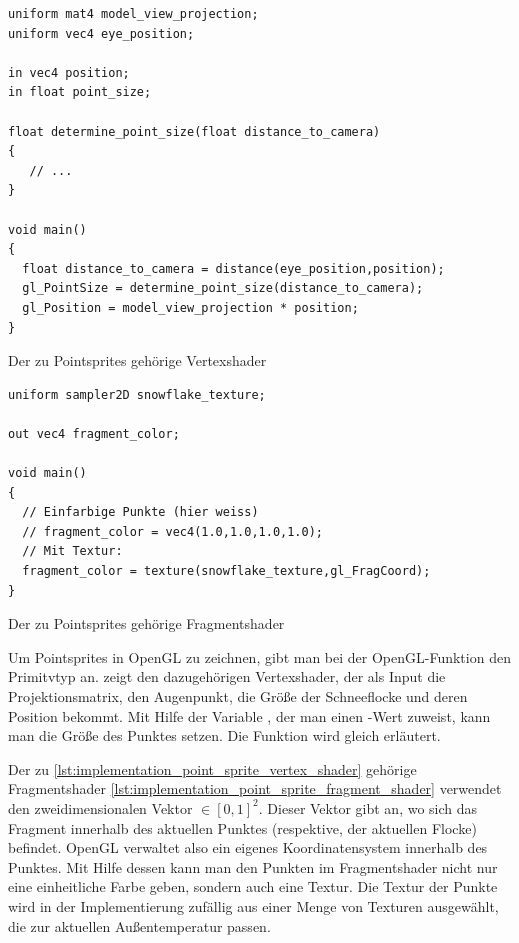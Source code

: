 \begin{listing}
\begin{verbatim}
uniform mat4 model_view_projection;
uniform vec4 eye_position;

in vec4 position;
in float point_size;

float determine_point_size(float distance_to_camera)
{
   // ...
}

void main()
{
  float distance_to_camera = distance(eye_position,position);
  gl_PointSize = determine_point_size(distance_to_camera);
  gl_Position = model_view_projection * position;
}
\end{verbatim}
\caption{Der zu Pointsprites gehörige Vertexshader}
\label{lst:implementation_point_sprite_vertex_shader}
\end{listing}

\begin{listing}
\begin{verbatim}
uniform sampler2D snowflake_texture;

out vec4 fragment_color;

void main()
{
  // Einfarbige Punkte (hier weiss)
  // fragment_color = vec4(1.0,1.0,1.0,1.0);
  // Mit Textur:
  fragment_color = texture(snowflake_texture,gl_FragCoord);
}
\end{verbatim}
\caption{Der zu Pointsprites gehörige Fragmentshader}
\label{lst:implementation_point_sprite_fragment_shader}
\end{listing}

Um Pointsprites in OpenGL zu zeichnen, gibt man bei der OpenGL-Funktion
 den Primitvtyp
an. 
zeigt den dazugehörigen Vertexshader, der als Input die
Projektionsmatrix, den Augenpunkt, die Größe der Schneeflocke und
deren Position bekommt. Mit Hilfe der Variable
, der man einen
-Wert zuweist, kann man die Größe des Punktes
setzen. Die Funktion  wird
gleich erläutert.

Der zu
\cref{lst:implementation_point_sprite_vertex_shader}
gehörige Fragmentshader
\cref{lst:implementation_point_sprite_fragment_shader}
verwendet den zweidimensionalen Vektor
 $\in {[0,1]}^2$. Dieser Vektor gibt
an, wo sich das Fragment innerhalb des aktuellen Punktes (respektive,
der aktuellen Flocke) befindet. OpenGL verwaltet also ein eigenes
Koordinatensystem innerhalb des Punktes. Mit Hilfe dessen kann man den
Punkten im Fragmentshader nicht nur eine einheitliche Farbe geben,
sondern auch eine Textur. Die Textur der Punkte wird in der
Implementierung zufällig aus einer Menge von Texturen ausgewählt, die
zur aktuellen Außentemperatur passen.


